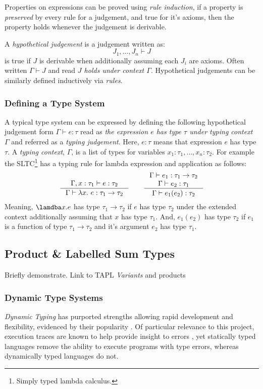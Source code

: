 Properties on expressions can be proved using \textit{rule induction}, if a property is \textit{preserved} by every rule for a judgement, and true for it's axioms, then the property holds whenever the judgement is derivable.

A \textit{hypothetical judgement} is a judgement written as: 
\[J_1, \dots, J_n \vdash J\]
is true if $J$ is derivable when additionally assuming each $J_i$ are axioms. Often written $\Gamma \vdash J$ and read \textit{$J$ holds under context $\Gamma$}. Hypothetical judgements can be similarly defined inductively via \textit{rules}.

\subsubsection{Defining a Type System}
A typical type system can be expressed by defining the following hypothetical judgement form $\Gamma \vdash e : \tau$ read as \textit{the expression $e$ has type $\tau$ under typing context $\Gamma$} and referred as a \textit{typing judgement}. Here, $e : \tau$ means that expression $e$ has type $\tau$.  A \textit{typing context}, $\Gamma$, is a list of types for variables $x_1 : \tau_1, \dots, x_n : \tau_2$. For example the SLTC\footnote{Simply typed lambda calculus.} \cite[ch. 9]{TAPL} has a typing rule for lambda expression and application as follows:
\[\inference{\Gamma, x : \tau_1 \vdash e : \tau_2}{\Gamma \vdash \lambda x.\ e : \tau_1 \to \tau_2} \qquad \inference{\Gamma \vdash e_1 : \tau_1 \to \tau_2\\ \Gamma \vdash e_2 : \tau_1}{\Gamma \vdash e_1(e_2) : \tau_2}\]
Meaning, $\lamdba x. e$ has type $\tau_1 \to \tau_2$ if $e$ has type $\tau_2$ under the extended context additionally assuming that $x$ has type $\tau_1$.
And, $e_1(e_2)$ has type $\tau_2$ if $e_1$ is a function of type $\tau_1 \to \tau_2$ and it's argument $e_2$ has type $\tau_1$.

\subsection{Product \& Labelled Sum Types}
Briefly demonstrate. Link to TAPL \textit{Variants} and products

\subsubsection{Dynamic Type Systems}
\label{sec:dynamictypes}
\textit{Dynamic Typing} has purported strengths allowing rapid development and flexibility, evidenced by their popularity \cite{DynamicLangShift, TIOBE}. Of particular relevance to this project, execution traces are known to help provide insight to errors \cite{TraceVisualisation}, yet statically typed languages remove the ability to execute programs with type errors, whereas dynamically typed languages do not.\par 

